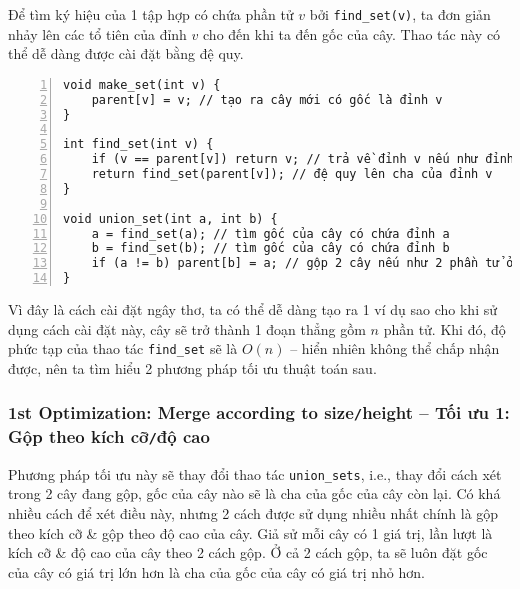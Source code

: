 \documentclass{article}
\begin{document}
Để tìm ký hiệu của 1 tập hợp có chứa phần tử $v$ bởi \verb|find_set(v)|, ta đơn giản nhảy lên các tổ tiên của đỉnh $v$ cho đến khi ta đến gốc của cây. Thao tác này có thể dễ dàng được cài đặt bằng đệ quy.
\begin{Verbatim}[numbers=left,xleftmargin=5mm]
void make_set(int v) {
    parent[v] = v; // tạo ra cây mới có gốc là đỉnh v
}

int find_set(int v) {
    if (v == parent[v]) return v; // trả về đỉnh v nếu như đỉnh v là gốc của cây
    return find_set(parent[v]); // đệ quy lên cha của đỉnh v
}

void union_set(int a, int b) {
    a = find_set(a); // tìm gốc của cây có chứa đỉnh a
    b = find_set(b); // tìm gốc của cây có chứa đỉnh b
    if (a != b) parent[b] = a; // gộp 2 cây nếu như 2 phần tử ở 2 cây khác nhau
}
\end{Verbatim}
Vì đây là cách cài đặt ngây thơ, ta có thể dễ dàng tạo ra 1 ví dụ sao cho khi sử dụng cách cài đặt này, cây sẽ trở thành 1 đoạn thẳng gồm $n$ phần tử. Khi đó, độ phức tạp của thao tác \verb|find_set| sẽ là $O(n)$ -- hiển nhiên không thể chấp nhận được, nên ta tìm hiểu 2 phương pháp tối ưu thuật toán sau.


\subsubsection{1st Optimization: Merge according to size{\tt/}height -- Tối ưu 1: Gộp theo kích cỡ{\tt/}độ cao}
Phương pháp tối ưu này sẽ thay đổi thao tác \verb|union_sets|, i.e., thay đổi cách xét trong 2 cây đang gộp, gốc của cây nào sẽ là cha của gốc của cây còn lại. Có khá nhiều cách để xét điều này, nhưng 2 cách được sử dụng nhiều nhất chính là gộp theo kích cỡ \& gộp theo độ cao của cây. Giả sử mỗi cây có 1 giá trị, lần lượt là kích cỡ \& độ cao của cây theo 2 cách gộp. Ở cả 2 cách gộp, ta sẽ luôn đặt gốc của cây có giá trị lớn hơn là cha của gốc của cây có giá trị nhỏ hơn.
\end{document}
